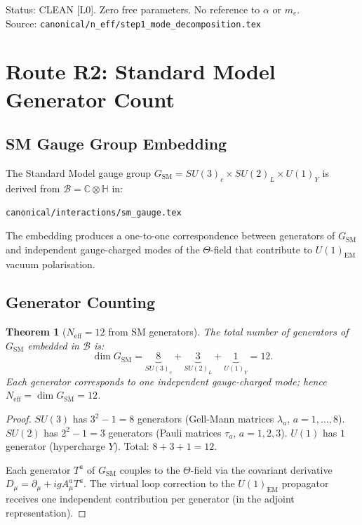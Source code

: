 \documentclass[12pt,a4paper]{article}
\newtheorem{theorem}{Theorem}[section]
\theoremstyle{definition}
\theoremstyle{remark}
\begin{document}
\begin{resultbox}
Status: CLEAN [L0].  Zero free parameters.  No reference to $\alpha$ or $m_e$.\\
Source: \texttt{canonical/n\_eff/step1\_mode\_decomposition.tex}
\end{resultbox}

\section{Route R2: Standard Model Generator Count}
\label{sec:neff12:R2}

\subsection{SM Gauge Group Embedding}
\label{ssec:neff12:R2:embedding}

The Standard Model gauge group $G_{\mathrm{SM}} = SU(3)_c \times SU(2)_L \times U(1)_Y$
is derived from $\mathcal{B} = \mathbb{C}\otimes\mathbb{H}$ in:
\begin{center}
\texttt{canonical/interactions/sm\_gauge.tex}
\end{center}

The embedding produces a one-to-one correspondence between generators of $G_{\mathrm{SM}}$
and independent gauge-charged modes of the $\Theta$-field that contribute to
$U(1)_{\mathrm{EM}}$ vacuum polarisation.

\subsection{Generator Counting}
\label{ssec:neff12:R2:count}

\begin{theorem}[$N_{\mathrm{eff}} = 12$ from SM generators]
\label{thm:neff12:R2}
The total number of generators of $G_{\mathrm{SM}}$ embedded in $\mathcal{B}$ is:
\begin{equation}
  \dim G_{\mathrm{SM}}
  = \underbrace{8}_{SU(3)_c}
  + \underbrace{3}_{SU(2)_L}
  + \underbrace{1}_{U(1)_Y}
  = 12.
  \label{eq:neff12:R2}
\end{equation}
Each generator corresponds to one independent gauge-charged mode; hence
$N_{\mathrm{eff}} = \dim G_{\mathrm{SM}} = 12$.
\end{theorem}

\begin{proof}
$SU(3)$ has $3^2 - 1 = 8$ generators (Gell-Mann matrices $\lambda_a$, $a=1,\ldots,8$).
$SU(2)$ has $2^2 - 1 = 3$ generators (Pauli matrices $\tau_a$, $a=1,2,3$).
$U(1)$ has $1$ generator (hypercharge $Y$).
Total: $8 + 3 + 1 = 12$.

Each generator $T^a$ of $G_{\mathrm{SM}}$ couples to the $\Theta$-field via
the covariant derivative $D_\mu = \partial_\mu + igA^a_\mu T^a$.  The virtual
loop correction to the $U(1)_{\mathrm{EM}}$ propagator receives one independent
contribution per generator (in the adjoint representation).
\end{proof}
\end{document}
